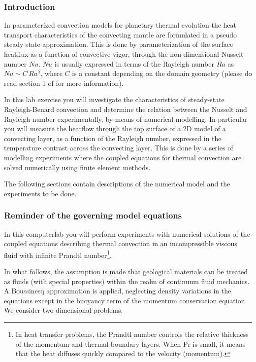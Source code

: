 
\subsubsection{Introduction}

In parameterized convection models for planetary thermal evolution the heat transport characteristics 
of the convecting mantle are formulated in a pseudo steady state approximation. 
This is done by parameterization of the surface heatflux as a function of convective vigor, 
through the non-dimensional Nusselt number $Nu$. 
$Nu$ is usually expressed in terms of the 
Rayleigh number $Ra$ as $Nu \sim C\, Ra^\beta$, where $C$ is a constant depending on the domain geometry
(please do read section 1 of \cite{wodd09} for more information).

In this lab exercise you will investigate the characteristics of steady-state Rayleigh-Benard convection 
and determine the relation between the Nusselt and Rayleigh number experimentally, 
by means of numerical modelling. In particular you will measure the heatflow through the top surface of 
a 2D model of a convecting layer, as a function of the Rayleigh number, expressed in the temperature 
contrast across the convecting layer. 
This is done by a series of modelling experiments where the coupled equations for thermal convection are solved 
numerically using finite element methods.

The following sections contain descriptions of the numerical model and the experiments to be done. 

\subsubsection{Reminder of the governing model equations}

In this computerlab you will perform experiments with numerical solutions of the coupled equations describing thermal convection in an incompressible viscous fluid with infinite Prandtl number\footnote{In heat transfer problems, the Prandtl number controls the relative thickness of the momentum and thermal boundary layers. When Pr is small, it means that the heat diffuses quickly compared to the velocity (momentum).}.

In what follows, the assumption is made that geological materials can be treated as fluids (with 
special properties) within the realm of continuum fluid mechanics.
A Boussinesq approximation is applied, neglecting density variations in the equations except in the buoyancy term of the momentum conservation equation. We consider two-dimensional problems.


